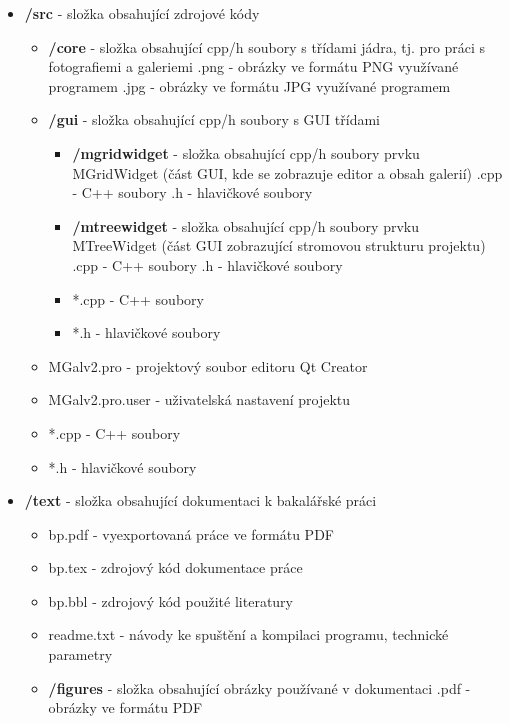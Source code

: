\documentclass[11pt,twoside,a4paper]{book}
\begin{document}
\begin{itemize}
\begin{itemize}
\item \textbf{/src} - složka obsahující zdrojové kódy
	\begin{itemize}
	\item \textbf{/core} - složka obsahující cpp/h soubory s třídami jádra, tj. pro práci s fotografiemi a galeriemi
		\subitem *.png - obrázky ve formátu PNG využívané programem
		\subitem *.jpg - obrázky ve formátu JPG využívané programem
	\item \textbf{/gui} - složka obsahující cpp/h soubory s GUI třídami
		\begin{itemize}		
		\item \textbf{/mgridwidget} - složka obsahující cpp/h soubory prvku MGridWidget (část GUI, kde se zobrazuje editor a obsah galerií)			
			\subitem *.cpp - C++ soubory
			\subitem *.h - hlavičkové soubory
		\item \textbf{/mtreewidget} - složka obsahující cpp/h soubory prvku MTreeWidget (část GUI zobrazující stromovou strukturu projektu)
			\subitem *.cpp - C++ soubory
			\subitem *.h - hlavičkové soubory
		\item *.cpp - C++ soubory
		\item *.h - hlavičkové soubory
		\end{itemize}			
	\item MGalv2.pro - projektový soubor editoru Qt Creator
	\item MGalv2.pro.user - uživatelská nastavení projektu
	\item *.cpp - C++ soubory
	\item *.h - hlavičkové soubory
	\end{itemize}
\item \textbf{/text} - složka obsahující dokumentaci k bakalářské práci
	\begin{itemize}
	\item bp.pdf - vyexportovaná práce ve formátu PDF
	\item bp.tex - zdrojový kód dokumentace práce
	\item bp.bbl - zdrojový kód použité literatury
	\item readme.txt - návody ke spuštění a kompilaci programu, technické parametry
	\item \textbf{/figures} - složka obsahující obrázky používané v dokumentaci
	\subitem *.pdf - obrázky ve formátu PDF
	\end{itemize}	
\end{itemize}
\end{itemize}
\end{document}
